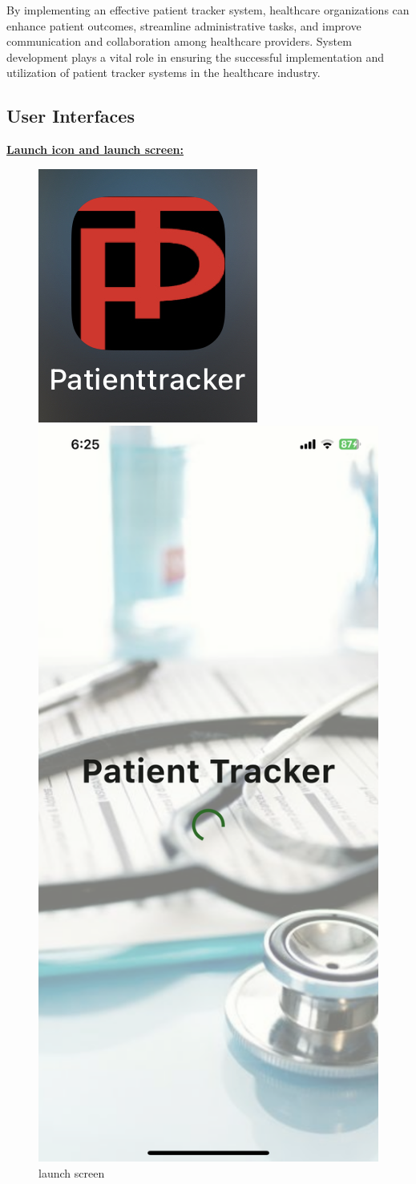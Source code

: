 \documentclass[12pt]{article}
\begin{document}
			By implementing an effective patient tracker system, healthcare organizations can
			enhance patient outcomes, streamline administrative tasks, and improve communication
			and collaboration among healthcare providers. System development plays a vital role in
			ensuring the successful implementation and utilization of patient tracker systems in the
			healthcare industry.
			\newpage
			\subsection{User Interfaces}
			
			\quad \textbf{\underline{Launch icon and launch screen:}}
			
			\begin{figure}[!htb]
				\begin{minipage}{0.48\textwidth}
					\centering
					\includegraphics[width=.5\linewidth]{launchIcon.jpg}
					\caption{Launch icon}\label{Launch icon}
				\end{minipage}\hfill
				\begin{minipage}{0.48\textwidth}
					\centering
					\includegraphics[width=.4\linewidth]{launchScreen.png}
					\caption{launch screen}\label{launch screen}
				\end{minipage}
			\end{figure}
		
\end{document}
